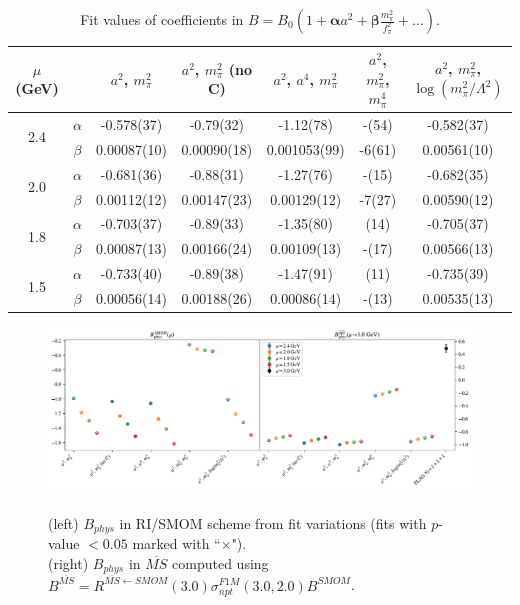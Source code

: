 \documentclass[12pt]{extarticle}
\begin{document}
\begin{table}[h!]
\begin{center}
\begin{tabular}{|c c|c|c|c|c|c|}
\hline
$\mu$ (GeV) &  & $a^2$, $m_\pi^2$& $a^2$, $m_\pi^2$ (no C)& $a^2$, $a^4$, $m_\pi^2$& $a^2$, $m_\pi^2$, $m_\pi^4$& $a^2$, $m_\pi^2$, $\log(m_\pi^2/\Lambda^2)$\\
\hline
\multirow{2}{0.5in}{2.4} & $\alpha$ & -0.578(37)& -0.79(32)& -1.12(78)& -(54)& -0.582(37)\\
 & $\beta$ & 0.00087(10)& 0.00090(18)& 0.001053(99)& -6(61)& 0.00561(10)\\
\hline
\multirow{2}{0.5in}{2.0} & $\alpha$ & -0.681(36)& -0.88(31)& -1.27(76)& -(15)& -0.682(35)\\
 & $\beta$ & 0.00112(12)& 0.00147(23)& 0.00129(12)& -7(27)& 0.00590(12)\\
\hline
\multirow{2}{0.5in}{1.8} & $\alpha$ & -0.703(37)& -0.89(33)& -1.35(80)& (14)& -0.705(37)\\
 & $\beta$ & 0.00087(13)& 0.00166(24)& 0.00109(13)& -(17)& 0.00566(13)\\
\hline
\multirow{2}{0.5in}{1.5} & $\alpha$ & -0.733(40)& -0.89(38)& -1.47(91)& (11)& -0.735(39)\\
 & $\beta$ & 0.00056(14)& 0.00188(26)& 0.00086(14)& -(13)& 0.00535(13)\\
\hline
\end{tabular}
\caption{Fit values of coefficients in $B = B_0(1 + \mathbf{\alpha} a^2 + \mathbf{\beta} \frac{m_\pi^2}{f_\pi^2} + \ldots)$.}
\end{center}
\end{table}
\begin{figure}
\centering
\includegraphics[page=1, width=1.1\textwidth]{plots/TT_fit_summary.pdf}
\caption{\\(left) $B_{phys}$ in RI/SMOM scheme from fit variations (fits with $p$-value $<0.05$ marked with ``$\times$"). \\(right) $B_{phys}$ in $\overline{MS}$ computed using $B^{\overline{MS}} = R^{\overline{MS}\leftarrow SMOM}(3.0)\sigma_{npt}^{F1M}(3.0, 2.0) B^{SMOM}$.}
\end{figure}
\end{document}
